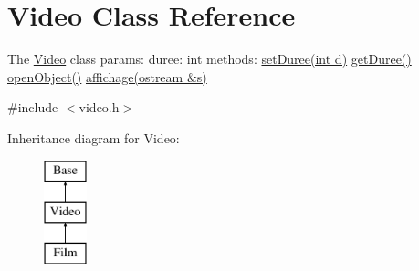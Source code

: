 \hypertarget{classVideo}{\section{Video Class Reference}
\label{classVideo}
}


The \hyperlink{classVideo}{Video} class params\-: duree\-: int methods\-: \hyperlink{classVideo_af9bf19109d8c613426173524942a59f0}{set\-Duree(int d)} \hyperlink{classVideo_a6ce28ec6b467212e7bb3cbf635b57598}{get\-Duree()} \hyperlink{classVideo_af6a8d2f22330651f3f264292e580dca3}{open\-Object()} \hyperlink{classVideo_a180c985ff368f77d0fb66ec106106f00}{affichage(ostream \&s)}  




{\ttfamily \#include $<$video.\-h$>$}

Inheritance diagram for Video\-:\begin{figure}[H]
\begin{center}
\leavevmode
\includegraphics[height=3.000000cm]{classVideo}
\end{center}
\end{figure}
